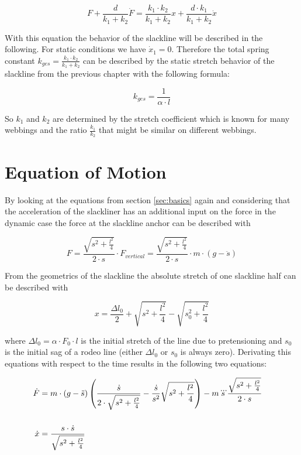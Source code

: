 \begin{equation}
	F + \frac{d}{k_1 + k_2} \dot F = \frac{k_1 \cdot k_2}{k_1 + k_2} x + \frac{d \cdot k_1}{k_1 + k_2} \dot x
	\label{eqn:linearSolidModel}
\end{equation}

With this equation the behavior of the slackline will be described in the following. For static conditions we have $\dot x_1 = 0$. Therefore the total spring constant $k_{ges} = \frac{k_1 \cdot k_2}{k_1 + k_2}$ can be described by the static stretch behavior of the slackline from the previous chapter with the following formula:

\begin{equation}
	k_{ges} = \frac{1}{\alpha \cdot l}
\end{equation}

So $k_1$ and $k_2$ are determined by the stretch coefficient which is known for many webbings and the ratio $\frac{k_1}{k_2}$ that might be similar on different webbings.

\section{Equation of Motion}

By looking at the equations from section \ref{sec:basics} again and considering that the acceleration of the slackliner has an additional input on the force in the dynamic case the force at the slackline anchor can be described with

\begin{equation}
	F = \frac{\sqrt{s^2 + \frac{l^2}{4}}}{2 \cdot s} \cdot F_{vertical} = \frac{\sqrt{s^2 + \frac{l^2}{4}}}{2 \cdot s} \cdot m\cdot (g - \ddot s)
\end{equation}

From the geometrics of the slackline the absolute stretch of one slackline half can be described with

\begin{equation}
	x = \frac{\Delta l_0}{2} + \sqrt{s^2 + \frac{l^2}{4}} - \sqrt{s_0^2 + \frac{l^2}{4}}
\end{equation}

where $\Delta l_0 = \alpha \cdot F_0 \cdot l$ is the initial stretch of the line due to pretensioning and $s_0$ is the initial sag of a rodeo line (either $\Delta l_0$ or $s_0$ is always zero). Derivating this equations with respect to the time results in the following two equations:

\begin{align}
	\dot F & \begin{multlined}[t]=  m \cdot (g - \ddot s) \left( \frac{\dot s}{2 \cdot \sqrt{s^2 + \frac{l^2}{4}}} - \frac{\dot s}{s^2} \sqrt{s^2 + \frac{l^2}{4}} \right) - \insertForSmartphone{\\}
	m \dddot s \frac{\sqrt{s^2 + \frac{l^2}{4}}}{2 \cdot s} \\
	\end{multlined}\\
	\dot x &= \frac{s \cdot \dot s}{\sqrt{s^2 + \frac{l^2}{4}}}
\end{align}

